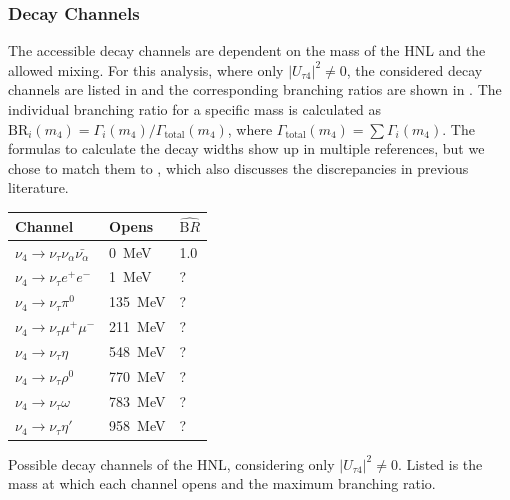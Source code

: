 \subsubsection{Decay Channels} 

The accessible decay channels are dependent on the mass of the HNL and the allowed mixing. For this analysis, where only $|U_{\tau4}|^2 \neq 0$, the considered decay channels are listed in  and the corresponding branching ratios are shown in . The individual branching ratio for a specific mass is calculated as $\mathrm{BR}_i(m_4)=\Gamma_i(m_4)/\Gamma_\mathrm{total}(m_4)$, where $\Gamma_\mathrm{total}(m_4)=\sum\Gamma_i(m_4)$. The formulas to calculate the decay widths show up in multiple references, but we chose to match them to , which also discusses the discrepancies in previous literature.

\begin{margintable}
    \footnotesize
    \begin{tabular} { lll }
        \hline\hline 
        \textbf{Channel} & \textbf{Opens} & \textbf{$\hat{\mathrm BR}$} \\
        \hline\hline 
        $\nu_4 \rightarrow \nu_\tau \nu_\alpha \bar{\nu_\alpha}$ & \SI{0}{\MeV} & 1.0 \\
        $\nu_4 \rightarrow \nu_\tau e^+ e^-$ & \SI{1}{\MeV} & ? \\
        $\nu_4 \rightarrow \nu_\tau \pi^0$ & \SI{135}{\MeV} & ? \\
        $\nu_4 \rightarrow \nu_\tau \mu^+ \mu^-$ & \SI{211}{\MeV} & ? \\
        $\nu_4 \rightarrow \nu_\tau \eta$ & \SI{548}{\MeV} & ? \\
        $\nu_4 \rightarrow \nu_\tau \rho^0$ & \SI{770}{\MeV} & ? \\
        $\nu_4 \rightarrow \nu_\tau \omega$ & \SI{783}{\MeV} & ? \\
        $\nu_4 \rightarrow \nu_\tau \eta'$ & \SI{958}{\MeV} & ? \\
        \hline
    \end{tabular}
    \caption[HNL mass dependent decay channels]{Possible decay channels of the HNL, considering only $|U_{\tau4}|^2 \neq 0$. Listed is the mass at which each channel opens and the maximum branching ratio.}
\end{margintable}


